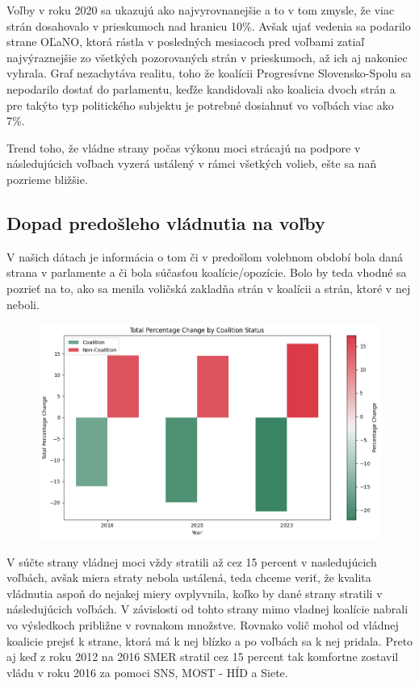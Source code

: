\documentclass[report.tex]{subfiles}
\begin{document}
Voľby v roku 2020 sa ukazujú ako najvyrovnanejšie a to v tom zmysle, že viac strán dosahovalo v prieskumoch nad hranicu 10\%. Avšak ujať vedenia sa podarilo strane OĽaNO, ktorá rástla v posledných mesiacoch pred voľbami zatiaľ najvýraznejšie zo všetkých pozorovaných strán v prieskumoch, až ich aj nakoniec vyhrala. Graf nezachytáva realitu, toho že koalícii Progresívne Slovensko-Spolu sa nepodarilo dostať do parlamentu, keďže kandidovali ako koalicia dvoch strán a pre takýto typ politického subjektu je potrebné dosiahnuť vo voľbách viac ako 7\%. 

Trend toho, že vládne strany počas výkonu moci strácajú na podpore v následujúcich voľbach vyzerá ustálený v rámci všetkých volieb, ešte sa naň pozrieme bližšie. 

\subsection{Dopad predošleho vládnutia na voľby}

V našich dátach je informácia o tom či v predošlom volebnom období bola daná strana v parlamente a či bola súčasťou koalície/opozície. Bolo by teda vhodné sa pozrieť na to, ako sa menila voličská zakladňa strán v koalícii a strán, ktoré v nej neboli. 

\begin{figure}[!htbp]
    \centering
    \includegraphics[width=\textwidth]{images_exploratory/Coalition_vs_NoCoalition.png}
    \caption{}
\end{figure}

V súčte strany vládnej moci vždy stratili až cez 15 percent v nasledujúcich voľbách, avšak miera straty nebola ustálená, teda chceme veriť, že kvalita vládnutia aspoň do nejakej miery ovplyvnila, koľko by dané strany stratili v následujúcich voľbách. V závislosti od tohto strany mimo vladnej koalície nabrali vo výsledkoch približne v rovnakom množstve. Rovnako volič mohol od vládnej koalicie prejsť k strane, ktorá má k nej blízko a po voľbách sa k nej pridala. Preto aj keď z roku 2012 na 2016 SMER stratil cez 15 percent tak komfortne zostavil vládu v roku 2016 za pomoci SNS, MOST - HÍD a Siete.
\end{document}
